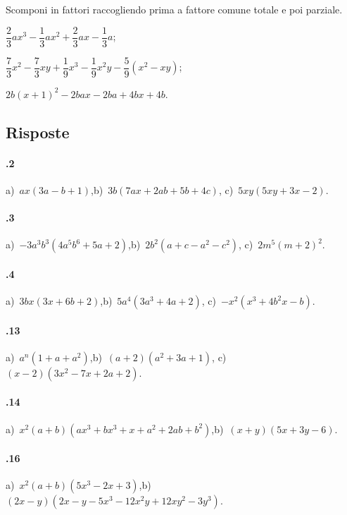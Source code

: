 \begin{esercizio}[\Ast]
\label{ese:15.34}
Scomponi in fattori raccogliendo prima a fattore comune totale e poi parziale.
\begin{enumeratea}
 \item $\dfrac{2}{3}ax^{3}-\dfrac{1}{3}ax^{2}+\dfrac{2}{3}ax-\dfrac{1}{3}a$;
 \item $\dfrac{7}{3}x^{2}-\dfrac{7}{3}xy+\dfrac{1}{9}x^{3}-\dfrac{1}{9}x^{2}y-\dfrac{5}{9}(x^{2}-xy)$;
 \item $2b(x+1)^{2}-2bax-2ba+4bx+4b$.
\end{enumeratea}
\end{esercizio}

\subsection{Risposte}

\paragraph{\thechapter.2}
a)~$ax(3a-b+1)$,\quad b)~$3b(7ax+2ab+5b+4c)$, \quad c)~$5xy(5xy+3x-2)$.

\paragraph{\thechapter.3}
a)~$-3a^{3}b^{3}\left(4a^{5}b^{6}+5a+2\right)$,\quad b)~$2b^{2}(a+c-a^{2}-c^{2})$, \quad c)~$2m^{5}\left(m+2\right)^{2}$.

\paragraph{\thechapter.4}
a)~$3bx(3x+6b+2)$,\quad b)~$5a^{4}\left(3a^{3}+4a+2\right)$, \quad c)~$-x^{2}\left(x^{3}+4b^{2}x-b\right)$.

\paragraph{\thechapter.13}
a)~$a^{n}(1+a+a^{2})$,\quad b)~$(a+2)\left(a^{2}+3a+1\right)$, \quad c)~$(x-2)\left(3x^2-7x+2a+2\right)$.

\paragraph{\thechapter.14}
a)~$x^{2}(a+b)(ax^{3}+bx^{3}+x+a^{2}+2ab+b^{2})$,\quad b)~$(x+y)\left(5x+3y-6\right)$.

\paragraph{\thechapter.16}
a)~$x^{2}(a+b)(5x^{3}-2x+3)$,\quad b)~$(2x-y)\left(2x-y-5x^3-12x^2y+12xy^2-3y^3\right)$.

